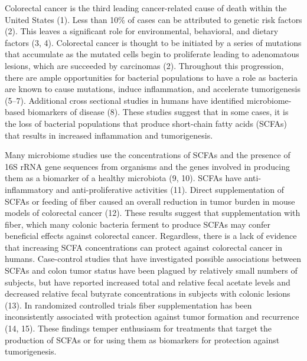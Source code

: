 \documentclass[11pt,]{article}
\begin{document}
\newpage

Colorectal cancer is the third leading cancer-related cause of death
within the United States (1). Less than 10\% of cases can be attributed
to genetic risk factors (2). This leaves a significant role for
environmental, behavioral, and dietary factors (3, 4). Colorectal cancer
is thought to be initiated by a series of mutations that accumulate as
the mutated cells begin to proliferate leading to adenomatous lesions,
which are succeeded by carcinomas (2). Throughout this progression,
there are ample opportunities for bacterial populations to have a role
as bacteria are known to cause mutations, induce inflammation, and
accelerate tumorigenesis (5--7). Additional cross sectional studies in
humans have identified microbiome-based biomarkers of disease (8). These
studies suggest that in some cases, it is the loss of bacterial
populations that produce short-chain fatty acids (SCFAs) that results in
increased inflammation and tumorigenesis.

Many microbiome studies use the concentrations of SCFAs and the presence
of 16S rRNA gene sequences from organisms and the genes involved in
producing them as a biomarker of a healthy microbiota (9, 10). SCFAs
have anti-inflammatory and anti-proliferative activities (11). Direct
supplementation of SCFAs or feeding of fiber caused an overall reduction
in tumor burden in mouse models of colorectal cancer (12). These results
suggest that supplementation with fiber, which many colonic bacteria
ferment to produce SCFAs may confer beneficial effects against
colorectal cancer. Regardless, there is a lack of evidence that
increasing SCFA concentrations can protect against colorectal cancer in
humans. Case-control studies that have investigated possible
associations between SCFAs and colon tumor status have been plagued by
relatively small numbers of subjects, but have reported increased total
and relative fecal acetate levels and decreased relative fecal butyrate
concentrations in subjects with colonic lesions (13). In randomized
controlled trials fiber supplementation has been inconsistently
associated with protection against tumor formation and recurrence (14,
15). These findings temper enthusiasm for treatments that target the
production of SCFAs or for using them as biomarkers for protection
against tumorigenesis.
\end{document}
